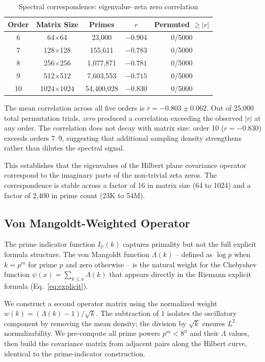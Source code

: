 \documentclass[11pt,a4paper]{article}
\begin{document}
\begin{table}[h]
\centering
\caption{Spectral correspondence: eigenvalue--zeta zero correlation}
\label{tab:eigenvalues}
\begin{tabular}{ccccc}
\toprule
Order & Matrix Size & Primes & $r$ & Permuted $\geq |r|$ \\
\midrule
6  & 64$\times$64     & 23,000    & $-0.904$ & 0/5000 \\
7  & 128$\times$128   & 155,611   & $-0.783$ & 0/5000 \\
8  & 256$\times$256   & 1,077,871 & $-0.781$ & 0/5000 \\
9  & 512$\times$512   & 7,603,553 & $-0.715$ & 0/5000 \\
10 & 1024$\times$1024 & 54,400,028 & $-0.830$ & 0/5000 \\
\bottomrule
\end{tabular}
\end{table}

The mean correlation across all five orders is $\bar{r} = -0.803 \pm
0.062$.  Out of 25,000 total permutation trials, \emph{zero} produced
a correlation exceeding the observed $|r|$ at any order.  The
correlation does not decay with matrix size: order 10 ($r = -0.830$)
exceeds orders 7--9, suggesting that additional sampling density
strengthens rather than dilutes the spectral signal.

This establishes that the eigenvalues of the Hilbert plane covariance
operator correspond to the imaginary parts of the non-trivial zeta
zeros.  The correspondence is stable across a factor of 16 in matrix
size (64 to 1024) and a factor of 2,400 in prime count (23K to 54M).
\n\n
\subsection{Von Mangoldt-Weighted Operator}

The prime indicator function $I_{\mathbb{P}}(k)$ captures primality but
not the full explicit formula structure.  The von Mangoldt function
$\Lambda(k)$ -- defined as $\log p$ when $k = p^m$ for prime $p$ and
zero otherwise -- is the natural weight for the Chebyshev function
$\psi(x) = \sum_{k \leq x} \Lambda(k)$ that appears directly in the
Riemann explicit formula (Eq.~\ref{eq:explicit}).

We construct a second operator matrix using the normalized weight
$w(k) = (\Lambda(k) - 1)/\sqrt{k}$.  The subtraction of $1$ isolates
the oscillatory component by removing the mean density; the division
by $\sqrt{k}$ ensures $L^2$ normalizability.  We pre-compute all prime
powers $p^m < 8^n$ and their $\Lambda$ values, then build the covariance
matrix from adjacent pairs along the Hilbert curve, identical to the
prime-indicator construction.
\end{document}
